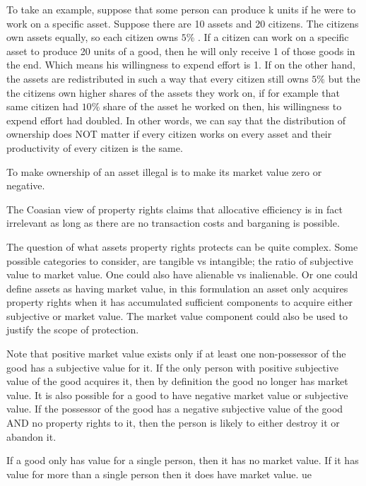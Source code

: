 \documentclass[12pt]{article}
\numberwithin{equation}{section}
\begin{document}

To take an example, suppose that some person can produce k units if he were to work on a specific asset. Suppose there are 10 assets and 20 citizens. The citizens own assets equally, so each citizen owns $5 \%$ . If a citizen can work on a specific asset to produce 20 units of a good, then he will only receive 1 of those goods in the end. Which means his willingness to expend effort is 1. If on the other hand, the assets are redistributed in such a way that every citizen still owns $5 \%$ but the the citizens own higher shares of the assets they work on, if for example that same citizen had $10\%$ share of the asset he worked on then, his willingness to expend effort had doubled. In other words, we can say that the distribution of ownership does NOT matter if every citizen works on every asset and their productivity of every citizen is the same. 



To make ownership of an asset illegal is to make its market value zero or negative. 

The Coasian view of property rights claims that allocative efficiency is in fact irrelevant as long as there are no transaction costs and barganing is possible. 

The question of what assets property rights protects can be quite complex. Some possible categories to consider, are tangible vs intangible; the ratio of subjective value to market value. One could also have alienable vs inalienable. Or one could define assets as having market value, in this formulation an asset only acquires property rights when it has accumulated sufficient components to acquire either subjective or market value. The market value component could also be used to justify the scope of protection. 

Note that positive market value exists only if at least one non-possessor of the good has a subjective value for it. If the only person with positive subjective value of the good acquires it, then by definition the good no longer has market value. It is also possible for a good to have negative market value or subjective value. If the possessor of the good has a negative subjective value of the good AND no property rights to it, then the person is likely to either destroy it or abandon it. 

If a good only has value for a single person, then it has no market value. If it has value for more than a single person then it does have market value. ue 
\end{document}
